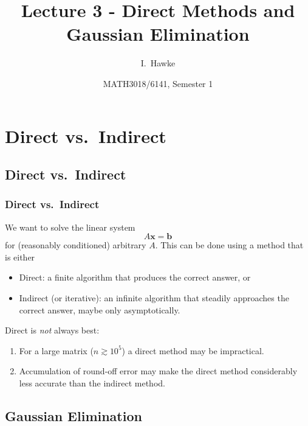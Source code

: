 \documentclass{beamer}
\title[Lecture 3] %
{Lecture 3 - Direct Methods and Gaussian Elimination}
\author[I. Hawke] %
{I.~Hawke}
\institute[University of Southampton] %
{
  School of Mathematics, \\
  University of Southampton, UK
}
\date[Semester 1] %
{MATH3018/6141, Semester 1}
\newcommand{\bb}{{\boldsymbol{b}}}
\newcommand{\bx}{{\boldsymbol{x}}}
\begin{document}
\begin{frame}
  \titlepage
\end{frame}

\section{Direct vs.\ Indirect}

\subsection{Direct vs.\ Indirect}

\begin{frame}
  \frametitle{Direct vs.\ Indirect}

  We want to solve the linear system
  \begin{equation*}
    A \bx = \bb
  \end{equation*}
  for (reasonably conditioned) arbitrary $A$. This can be done using a
  method that is either 
  \begin{itemize}
  \item Direct: a finite algorithm that produces the correct answer, or
  \item Indirect (or iterative): an infinite algorithm that steadily
    approaches the correct answer, maybe only asymptotically.
  \end{itemize}
  \pause

  \vspace{1ex}

  Direct is \emph{not} always best:
  \begin{enumerate}
  \item For a large matrix ($n \gtrsim 10^5$) a direct method may be
    impractical.
  \item Accumulation of round-off error may make the direct method
    considerably less accurate than the indirect method.
  \end{enumerate}

\end{frame}


\subsection{Gaussian Elimination}
\end{document}
